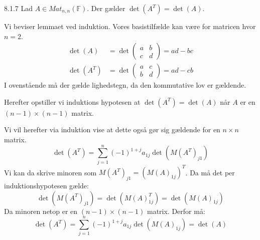 \begin{lemma}{8.1.7}
	Lad $A \in Mat_{n,n}(\mathbb{F})$. Der gælder $\det(A^T) = \det(A)$.
\end{lemma}

\begin{bevis}
	Vi beviser lemmaet ved induktion. Vores basistilfælde kan være for matricen 
	hvor $n = 2$.
	\begin{align*}
		\det(A) &= \det\begin{pmatrix}
			a & b \\
			c & d
		\end{pmatrix} = ad - bc\\
		\det(A^T) &= \det\begin{pmatrix}
			a & c \\
			b & d
		\end{pmatrix} = ad - cb
	\end{align*}
	I ovenstående må der gælde lighedstegn, da den kommutative lov er gældende.
	
	\noindent Herefter opstiller vi induktions hypotesen at $\det(A^T) = 
	\det(A)$ når $A$ er en $(n-1) \times (n-1)$ matrix.
	
	\noindent Vi vil herefter via induktion vise at dette også gør sig gældende
	for en $n \times n$ matrix.
	\[
		\det(A^T) = \sum_{j=1}^{n}(-1)^{1+j}a_{1j}\det(M(A^T)_{j1})
	\]
	Vi kan da skrive minoren som $M(A^T)_{j1} = (M(A)_{1j})^T$. Da må det per 
	induktionshypotesen gælde:
	\[
		\det(M(A^T)_{j1}) = \det(M(A)_{1j}^T) = \det(M(A)_{1j})
	\]
	Da minoren netop er en $(n-1) \times (n-1)$ matrix. Derfor må:
	\[
		\det(A^T) = \sum_{j=1}^{n}(-1)^{1+j}a_{1j}\det(M(A)_{1j}) = \det(A)
	\]
\end{bevis}

